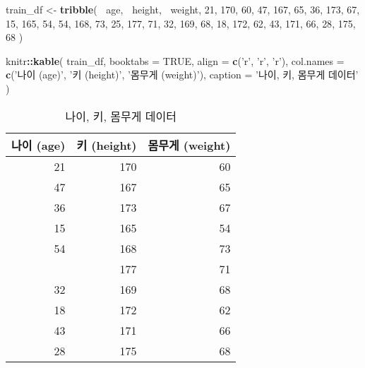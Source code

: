 \documentclass[]{book}
\newenvironment{Shaded}{\begin{snugshade}}{\end{snugshade}}
\newcommand{\DataTypeTok}[1]{\textcolor[rgb]{0.13,0.29,0.53}{#1}}
\newcommand{\DecValTok}[1]{\textcolor[rgb]{0.00,0.00,0.81}{#1}}
\newcommand{\KeywordTok}[1]{\textcolor[rgb]{0.13,0.29,0.53}{\textbf{#1}}}
\newcommand{\NormalTok}[1]{#1}
\newcommand{\OperatorTok}[1]{\textcolor[rgb]{0.81,0.36,0.00}{\textbf{#1}}}
\newcommand{\OtherTok}[1]{\textcolor[rgb]{0.56,0.35,0.01}{#1}}
\newcommand{\StringTok}[1]{\textcolor[rgb]{0.31,0.60,0.02}{#1}}
\begin{document}
\begin{Shaded}
\begin{Highlighting}[]
\NormalTok{train_df <-}\StringTok{ }\KeywordTok{tribble}\NormalTok{(}
  \OperatorTok{~}\NormalTok{age, }\OperatorTok{~}\NormalTok{height, }\OperatorTok{~}\NormalTok{weight,}
  \DecValTok{21}\NormalTok{, }\DecValTok{170}\NormalTok{, }\DecValTok{60}\NormalTok{,}
  \DecValTok{47}\NormalTok{, }\DecValTok{167}\NormalTok{, }\DecValTok{65}\NormalTok{,}
  \DecValTok{36}\NormalTok{, }\DecValTok{173}\NormalTok{, }\DecValTok{67}\NormalTok{,}
  \DecValTok{15}\NormalTok{, }\DecValTok{165}\NormalTok{, }\DecValTok{54}\NormalTok{,}
  \DecValTok{54}\NormalTok{, }\DecValTok{168}\NormalTok{, }\DecValTok{73}\NormalTok{,}
  \DecValTok{25}\NormalTok{, }\DecValTok{177}\NormalTok{, }\DecValTok{71}\NormalTok{,}
  \DecValTok{32}\NormalTok{, }\DecValTok{169}\NormalTok{, }\DecValTok{68}\NormalTok{,}
  \DecValTok{18}\NormalTok{, }\DecValTok{172}\NormalTok{, }\DecValTok{62}\NormalTok{,}
  \DecValTok{43}\NormalTok{, }\DecValTok{171}\NormalTok{, }\DecValTok{66}\NormalTok{,}
  \DecValTok{28}\NormalTok{, }\DecValTok{175}\NormalTok{, }\DecValTok{68}
\NormalTok{)}

\NormalTok{knitr}\OperatorTok{::}\KeywordTok{kable}\NormalTok{(}
\NormalTok{  train_df, }\DataTypeTok{booktabs =} \OtherTok{TRUE}\NormalTok{,}
  \DataTypeTok{align =} \KeywordTok{c}\NormalTok{(}\StringTok{'r'}\NormalTok{, }\StringTok{'r'}\NormalTok{, }\StringTok{'r'}\NormalTok{),}
  \DataTypeTok{col.names =} \KeywordTok{c}\NormalTok{(}\StringTok{'나이 (age)'}\NormalTok{, }\StringTok{'키 (height)'}\NormalTok{, }\StringTok{'몸무게 (weight)'}\NormalTok{),}
  \DataTypeTok{caption =} \StringTok{'나이, 키, 몸무게 데이터'}
\NormalTok{)}
\end{Highlighting}
\end{Shaded}

\begin{table}[t]

\caption{\label{tab:regression-age-height-weight-data}나이, 키, 몸무게 데이터}
\centering
\begin{tabular}{rrr}
\toprule
나이 (age) & 키 (height) & 몸무게 (weight)\\
\midrule
21 & 170 & 60\\
47 & 167 & 65\\
36 & 173 & 67\\
15 & 165 & 54\\
54 & 168 & 73\\
\addlinespace
25 & 177 & 71\\
32 & 169 & 68\\
18 & 172 & 62\\
43 & 171 & 66\\
28 & 175 & 68\\
\bottomrule
\end{tabular}
\end{table}
\end{document}
